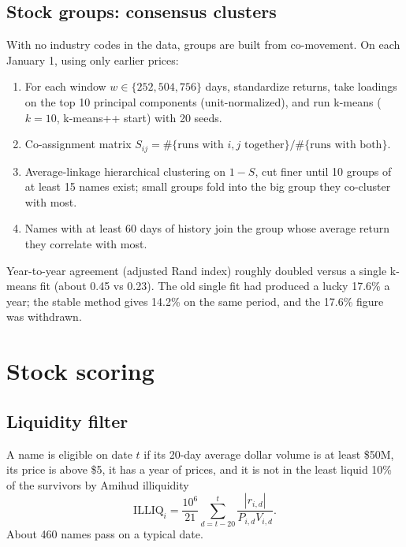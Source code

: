 \documentclass[11pt]{article}
\begin{document}
\subsection{Stock groups: consensus clusters}
With no industry codes in the data, groups are built from co-movement. On each January 1, using only earlier prices:
\begin{enumerate}
\item For each window $w\in\{252,504,756\}$ days, standardize returns, take loadings on the top 10 principal
components (unit-normalized), and run k-means ($k=10$, k-means++ start) with 20 seeds.
\item Co-assignment matrix $S_{ij} = \#\{\text{runs with } i,j \text{ together}\}/\#\{\text{runs with both}\}$.
\item Average-linkage hierarchical clustering on $1-S$, cut finer until 10 groups of at least 15 names exist; small groups fold into the big group they co-cluster with most.
\item Names with at least 60 days of history join the group whose average return they correlate with most.
\end{enumerate}
Year-to-year agreement (adjusted Rand index) roughly doubled versus a single k-means fit (about 0.45 vs 0.23). The old
single fit had produced a lucky 17.6\% a year; the stable method gives 14.2\% on the same period, and the 17.6\% figure
was withdrawn.

\section{Stock scoring}

\subsection{Liquidity filter}
A name is eligible on date $t$ if its 20-day average dollar volume is at least \$50M, its price is above \$5, it has a
year of prices, and it is not in the least liquid 10\% of the survivors by Amihud illiquidity
\[
\text{ILLIQ}_i = \frac{10^6}{21}\sum_{d=t-20}^{t} \frac{|r_{i,d}|}{P_{i,d}V_{i,d}}.
\]
About 460 names pass on a typical date.
\end{document}

